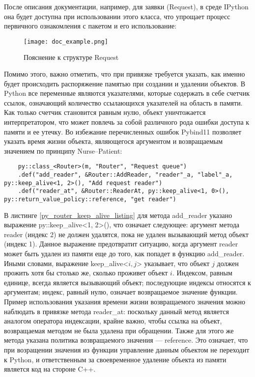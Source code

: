 После описания документации, например, для заявки (Request), в среде IPython она будет доступна при использовании этого класса, что упрощает процесс первичного ознакомления с пакетом и его использование:
\begin{figure}[H]
	\centering
	\texttt{[image: doc\_example.png]}
	\caption{Пояснение к структуре Request}
	\label{doc_example}
\end{figure}


Помимо этого, важно отметить, что при привязке требуется указать, как именно будет происходить распоряжение памятью при создании и удалении объектов. В Python все переменные являются указателями, которые содержать в себе счетчик ссылок, означающий количество ссылающихся указателей на область в памяти. Как только счетчик становится равным нулю, объект уничтожается интерпретатором, что может повлечь за собой различного рода ошибки доступа к памяти и ее утечку. Во избежание перечисленных ошибок Pybind11 позволяет указать время жизни объекта, являющегося аргументом и возвращаемым значением по принципу Nurse--Patient:
 
 \begin{lstlisting}
 	py::class_<Router>(m, "Router", "Request queue")
 	.def("add_reader", &Router::AddReader, "reader"_a, "label"_a, py::keep_alive<1, 2>(), "Add request reader")
 	.def("reader_at", &Router::ReaderAt, py::keep_alive<1, 0>(), py::return_value_policy::reference, "get reader")
 \end{lstlisting}

В листинге \ref{py_router_keep_alive_listing} для метода add\_reader указано выражение py::keep\_alive<1, 2>(), что означает следующее: аргумент метода reader (индекс 2) не должен удалятся, пока не удален вызывающий метод объект (индекс 1). Данное выражение предотвратит ситуацию, когда аргумент reader может быть удален из памяти еще до того, как попадет в функцию add\_reader. Иными словами, выражение keep\_alive<$i,j$> указывает, что объект $j$ должен прожить хотя бы столько же, сколько проживет объект $i$. Индексом, равным единице, всегда является вызывающий объект; последующие индексы относятся к аргументам; индекс, равный нулю, означает возвращаемое значение функции. Пример использования указания времени жизни возвращаемого значения можно наблюдать в привязке метода reader\_at: поскольку данный метод является аналогом оператора индексации, крайне важно, чтобы ссылка на объект, возвращаемая методом не была удалена при обращении. Также для этого же метода указана политика возвращаемого значения --- reference. Это означает, что при возращении значения из функции управление данным объектом не переходит к Python, и ответственным за своевременное удаление объекта из памяти является код на стороне C++.

